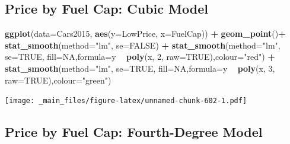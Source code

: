 \documentclass[]{book}
\newenvironment{Shaded}{\begin{snugshade}}{\end{snugshade}}
\newcommand{\KeywordTok}[1]{\textcolor[rgb]{0.13,0.29,0.53}{\textbf{#1}}}
\newcommand{\DataTypeTok}[1]{\textcolor[rgb]{0.13,0.29,0.53}{#1}}
\newcommand{\DecValTok}[1]{\textcolor[rgb]{0.00,0.00,0.81}{#1}}
\newcommand{\StringTok}[1]{\textcolor[rgb]{0.31,0.60,0.02}{#1}}
\newcommand{\OtherTok}[1]{\textcolor[rgb]{0.56,0.35,0.01}{#1}}
\newcommand{\OperatorTok}[1]{\textcolor[rgb]{0.81,0.36,0.00}{\textbf{#1}}}
\newcommand{\NormalTok}[1]{#1}
\begin{document}
\subsection{Price by Fuel Cap: Cubic
Model}\label{price-by-fuel-cap-cubic-model}

\begin{Shaded}
\begin{Highlighting}[]
\KeywordTok{ggplot}\NormalTok{(}\DataTypeTok{data=}\NormalTok{Cars2015, }\KeywordTok{aes}\NormalTok{(}\DataTypeTok{y=}\NormalTok{LowPrice, }\DataTypeTok{x=}\NormalTok{FuelCap)) }\OperatorTok{+}\StringTok{ }\KeywordTok{geom_point}\NormalTok{()}\OperatorTok{+}\StringTok{ }\KeywordTok{stat_smooth}\NormalTok{(}\DataTypeTok{method=}\StringTok{"lm"}\NormalTok{, }\DataTypeTok{se=}\OtherTok{FALSE}\NormalTok{) }\OperatorTok{+}
\StringTok{ }\KeywordTok{stat_smooth}\NormalTok{(}\DataTypeTok{method=}\StringTok{"lm"}\NormalTok{, }\DataTypeTok{se=}\OtherTok{TRUE}\NormalTok{, }\DataTypeTok{fill=}\OtherTok{NA}\NormalTok{,}\DataTypeTok{formula=}\NormalTok{y }\OperatorTok{~}\StringTok{ }\KeywordTok{poly}\NormalTok{(x, }\DecValTok{2}\NormalTok{, }\DataTypeTok{raw=}\OtherTok{TRUE}\NormalTok{),}\DataTypeTok{colour=}\StringTok{"red"}\NormalTok{) }\OperatorTok{+}\StringTok{ }
\StringTok{  }\KeywordTok{stat_smooth}\NormalTok{(}\DataTypeTok{method=}\StringTok{"lm"}\NormalTok{, }\DataTypeTok{se=}\OtherTok{TRUE}\NormalTok{, }\DataTypeTok{fill=}\OtherTok{NA}\NormalTok{,}\DataTypeTok{formula=}\NormalTok{y }\OperatorTok{~}\StringTok{ }\KeywordTok{poly}\NormalTok{(x, }\DecValTok{3}\NormalTok{, }\DataTypeTok{raw=}\OtherTok{TRUE}\NormalTok{),}\DataTypeTok{colour=}\StringTok{"green"}\NormalTok{)}
\end{Highlighting}
\end{Shaded}

\texttt{[image: \_main\_files/figure-latex/unnamed-chunk-602-1.pdf]}

\subsection{Price by Fuel Cap: Fourth-Degree
Model}\label{price-by-fuel-cap-fourth-degree-model}
\end{document}
